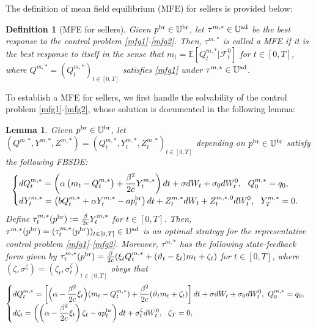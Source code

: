 \documentclass[11pt]{article}
\newtheorem{lemma}{Lemma}[section]
\newtheorem{definition}{Definition}[section]
\numberwithin{equation}{section}
\begin{document}
The definition of mean field equilibrium (MFE) for sellers is provided below:
\begin{definition}[MFE for sellers]\label{def}
Given $p^{{\rm br}}\in\mathbb{U}^{\rm br}$,  let $\tau^{m,*}\in\mathbb{U}^{\rm ad}$ be the best response to the control problem \eqref{mfg1}-\eqref{mfg2}. Then, $\tau^{m,*}$ is called a MFE if it is the best response to itself in the sense that $m_t=\mathbb{E}[Q_t^{m,*}| \mathcal{F}_t^0]$ for $t\in [0, T]$,  where $Q^{m,*}=(Q_t^{m,*})_{t\in[0,T]}$ satisfies \eqref{mfg1} under $\tau^{m,*}\in\mathbb{U}^{\rm ad}$.
\end{definition}
To establish a MFE for sellers, we first handle the solvability of the control problem \eqref{mfg1}-\eqref{mfg2}, whose solution is documented in the following lemma:   
\begin{lemma}\label{response}
Given $p^{{\rm br}}\in\mathbb{U}^{\rm br}$, let $(Q^{m,*},Y^{m,*},Z^{m,*})=(Q_t^{m,*},Y_t^{m,*},Z_t^{m,*})_{t\in[0,T]}$ depending on $p^{{\rm br}}\in\mathbb{U}^{\rm br}$ satisfy the following FBSDE:
\begin{align}\label{fbsde3.1}
\begin{cases}
    \displaystyle dQ_t^{m,*}=\left(\alpha\left(m_t-Q_t^{m,*}\right)+\frac{\beta^2}{2c}Y_t^{m,*}\right)dt+\sigma dW_t+\sigma_0dW_t^0,~~Q_0^{m,*}=q_0,\\[0.6em]
    \displaystyle dY_t^{m,*}=\left(bQ_t^{m,*}+\alpha Y_t^{m,*}- ap_t^{{\rm br}}\right)dt+Z_t^{m,*}dW_t+Z_t^{m, *,0}dW_t^0,~~Y_{T}^{m,*}=0.
\end{cases}
\end{align}
Define $\tau_t^{m,*}(p^{{\rm br}}):=\frac{\beta}{2c}Y_t^{m,*}$ for $t\in[0,T]$. Then, $\tau^{m,*}(p^{{\rm br}})=(\tau_t^{m,*}(p^{{\rm br}}))_{t\in[0,T]}\in\mathbb{U}^{\rm ad}$ is an optimal strategy for the representative control problem \eqref{mfg1}-\eqref{mfg2}. Moreover, $\tau^{m,*}$ has the following state-feedback form given by 	
$\tau_t^{m,*}(p^{{\rm br}})=\frac{\beta}{2c}(\xi_t Q_t^{m,*}+(\vartheta_t-\xi_t)m_t+\zeta_t)$ for $t\in [0, T]$, where
$(\zeta,\sigma^{\zeta})=(\zeta_t,\sigma_t^{\zeta})_{t\in[0,T]}$ obeys that
\begin{align}\label{fbsde3.2}
\begin{cases}
	\displaystyle dQ_t^{m,*}=\left[\Big(\alpha-\frac{\beta^2}{2c}\xi_t\Big)(m_t-Q_t^{m,*})+\frac{\beta ^2}{2c}(\vartheta_tm_t+\zeta_t)\right]dt+\sigma dW_t+\sigma_0dW_t^0,~Q_0^{m,*}=q_0,\\[0.5em]
	\displaystyle d\zeta_t=\left(\left(\alpha-\frac{\beta^2}{2c}\xi_t\right)\zeta_t- ap_t^{{\rm br}}\right)dt+\sigma_t^{\zeta}dW_t^0,~~\zeta_T=0,

\end{cases}
\end{align}
\end{lemma}
\end{document}
